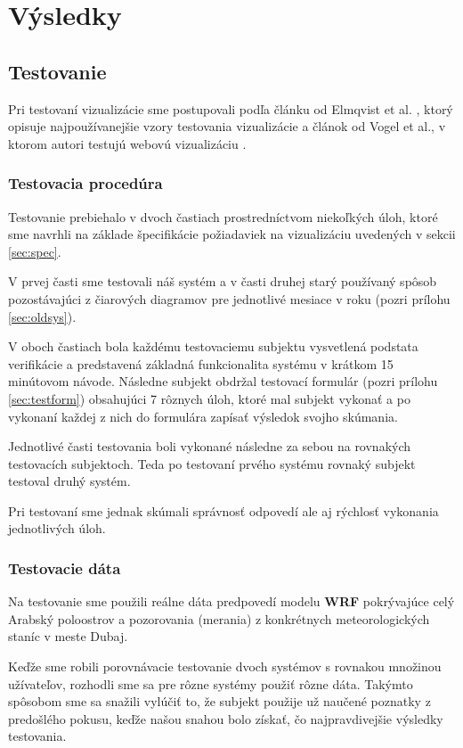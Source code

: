 \chapter{Výsledky}

\section{Testovanie}
Pri testovaní vizualizácie sme postupovali podľa článku od Elmqvist et al. \cite{Patterns}, ktorý opisuje najpoužívanejšie vzory testovania vizualizácie a článok od Vogel et al., v ktorom autori testujú webovú vizualizáciu \cite{WebBasedUserTest}.

\subsection{Testovacia procedúra}
Testovanie prebiehalo v dvoch častiach prostredníctvom niekoľkých úloh, ktoré sme navrhli na základe špecifikácie požiadaviek na vizualizáciu uvedených v sekcii \ref{sec:spec}.

V prvej časti sme testovali náš systém a v časti druhej starý používaný spôsob pozostávajúci z čiarových diagramov pre jednotlivé mesiace v roku (pozri prílohu \ref{sec:oldsys}).

V oboch častiach bola každému testovaciemu subjektu vysvetlená podstata verifikácie a predstavená základná funkcionalita systému v krátkom 15 minútovom návode. Následne subjekt obdržal testovací formulár (pozri prílohu \ref{sec:testform}) obsahujúci 7 rôznych úloh, ktoré mal subjekt vykonať a po vykonaní každej z nich do formulára zapísať výsledok svojho skúmania.

Jednotlivé časti testovania boli vykonané následne za sebou na rovnakých testovacích subjektoch. Teda po testovaní prvého systému rovnaký subjekt testoval druhý systém.

Pri testovaní sme jednak skúmali správnosť odpovedí ale aj rýchlosť vykonania jednotlivých úloh.

\subsection{Testovacie dáta}
Na testovanie sme použili reálne dáta predpovedí modelu \textbf{WRF} pokrývajúce celý Arabský poloostrov a pozorovania (merania) z konkrétnych meteorologických staníc v meste Dubaj.

Keďže sme robili porovnávacie testovanie dvoch systémov s rovnakou množinou užívateľov, rozhodli sme sa pre rôzne systémy použiť rôzne dáta. Takýmto spôsobom sme sa snažili vylúčiť to, že subjekt použije už naučené poznatky z predošlého pokusu, keďže našou snahou bolo získať, čo najpravdivejšie výsledky testovania. 

